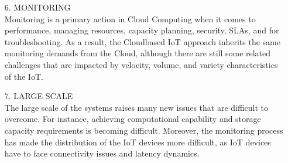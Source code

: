 \documentclass[11pt]{article}
\begin{document}
\begin{itemize}
 \item[6.]MONITORING \\
 Monitoring is a primary action in Cloud Computing when it
comes to performance, managing resources, capacity planning,
security, SLAs, and for troubleshooting. As a result, the Cloudbased IoT approach inherits the same monitoring demands
from the Cloud, although there are still some related challenges that are impacted by velocity, volume, and variety
characteristics of the IoT. 
 \item[7.]LARGE SCALE\\
The large scale of the systems raises many
new issues that are difficult to overcome. For instance,
achieving computational capability and storage capacity
requirements is becoming difficult. Moreover, the monitoring
process has made the distribution of the IoT devices more
difficult, as IoT devices have to face connectivity issues and
latency dynamics. 


\end{itemize}
\end{document}
